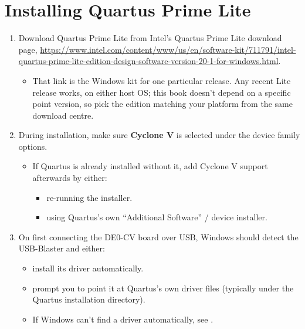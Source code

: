 \section{Installing Quartus Prime Lite}
\label{q:2}
\begin{enumerate}
  \item Download Quartus Prime Lite from Intel's Quartus Prime Lite download page,
    \url{https://www.intel.com/content/www/us/en/software-kit/711791/intel-quartus-prime-lite-edition-design-software-version-20-1-for-windows.html}.
  \begin{itemize}
    \item That link is the Windows kit for one particular release. Any recent Lite release works,
      on either host OS; this book doesn't depend on a specific point version, so pick the edition
      matching your platform from the same download centre.
  \end{itemize}
  \item During installation, make sure \textbf{Cyclone V} is selected under the device family
    options.
  \begin{itemize}
    \item If Quartus is already installed without it, add Cyclone V support afterwards by either:
    \begin{itemize}
      \item re-running the installer.
      \item using Quartus's own ``Additional Software'' / device installer.
    \end{itemize}
  \end{itemize}
  \item On first connecting the DE0-CV board over USB, Windows should detect the USB-Blaster and
    either:
  \begin{itemize}
    \item install its driver automatically.
    \item prompt you to point it at Quartus's own driver files (typically under the Quartus
      installation directory).
    \item If Windows can't find a driver automatically, see .
  \end{itemize}
\end{enumerate}

